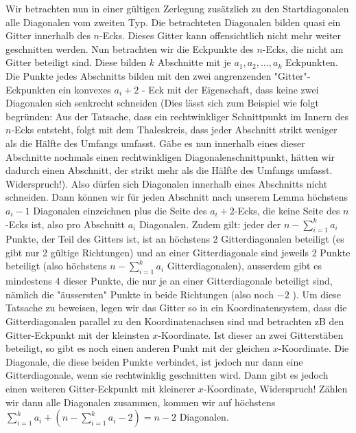 \documentclass[language=german,style=solution]{smo}
\begin{document}
\begin{enumerate}
\begin{itemize}
Wir betrachten nun in einer gültigen Zerlegung zusätzlich zu den Startdiagonalen alle Diagonalen vom zweiten Typ. Die betrachteten Diagonalen bilden quasi ein Gitter innerhalb des $n$-Ecks. Dieses Gitter kann offensichtlich nicht mehr weiter geschnitten werden. Nun betrachten wir die Eckpunkte des $n$-Ecks, die nicht am Gitter beteiligt sind. Diese bilden $k$ Abschnitte mit je $a_1, a_2, \dots , a_k$ Eckpunkten. Die Punkte jedes Abschnitts bilden mit den zwei angrenzenden "Gitter"-Eckpunkten ein konvexes $a_i + 2$ - Eck mit der Eigenschaft, dass keine zwei Diagonalen sich senkrecht schneiden (Dies lässt sich zum Beispiel wie folgt begründen: Aus der Tatsache, dass ein rechtwinkliger Schnittpunkt im Innern des $n$-Ecks entsteht, folgt mit dem Thaleskreis, dass jeder Abschnitt strikt weniger als die Hälfte des Umfangs umfasst. Gäbe es nun innerhalb eines dieser Abschnitte nochmals einen rechtwinkligen Diagonalenschnittpunkt, hätten wir dadurch einen Abschnitt, der strikt mehr als die Hälfte des Umfangs umfasst. Widerspruch!). Also dürfen sich Diagonalen innerhalb eines Abschnitts nicht schneiden. Dann können wir für jeden Abschnitt nach unserem Lemma höchstens $a_i - 1$ Diagonalen einzeichnen plus die Seite des $a_i + 2$-Ecks, die keine Seite des $n$-Ecks ist, also pro Abschnitt $a_i$ Diagonalen. Zudem gilt: jeder der $n - \sum_{i=1}^k a_i$ Punkte, der Teil des Gitters ist, ist an höchstens 2 Gitterdiagonalen beteiligt (es gibt nur 2 gültige Richtungen) und an einer Gitterdiagonale sind jeweils 2 Punkte beteiligt (also höchstens $n - \sum_{i=1}^k a_i$ Gitterdiagonalen), ausserdem gibt es mindestens $4$ dieser Punkte, die nur je an einer Gitterdiagonale beteiligt sind, nämlich die "äussersten" Punkte in beide Richtungen (also noch $-2$ ). Um diese Tatsache zu beweisen, legen wir das Gitter so in ein Koordinatensystem, dass die Gitterdiagonalen parallel zu den Koordinatenachsen sind und betrachten zB den Gitter-Eckpunkt mit der kleinsten $x$-Koordinate. Ist dieser an zwei Gitterstäben beteiligt, so gibt es noch einen anderen Punkt mit der gleichen $x$-Koordinate. Die Diagonale, die diese beiden Punkte verbindet, ist jedoch nur dann eine Gitterdiagonale, wenn sie rechtwinklig geschnitten wird. Dann gibt es jedoch einen weiteren Gitter-Eckpunkt mit kleinerer $x$-Koordinate, Widerspruch!  Zählen wir dann alle Diagonalen zusammen, kommen wir auf höchstens $\sum_{i=1}^k a_i + (n - \sum_{i=1}^k a_i - 2) = n-2$ Diagonalen.
\begin{figure}[h]
\centering

\end{figure}
\end{itemize}
\end{enumerate}
\end{document}
